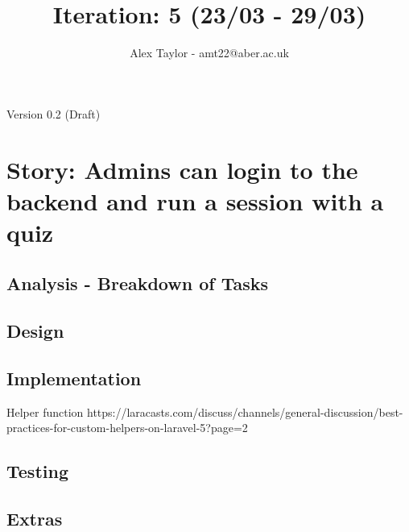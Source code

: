 \documentclass{article}
\title{Iteration: 5 (23/03 - 29/03)}
\author{Alex Taylor - amt22@aber.ac.uk}
\begin{document}
\maketitle
\begin{center}
	Version 0.2 (Draft)
\end{center}
\tableofcontents
\thispagestyle{empty}
\newpage

\section{Story: Admins can login to the backend and run a session with a quiz}
\subsection{Analysis - Breakdown of Tasks}
\subsection{Design}
\subsection{Implementation}
Helper function https://laracasts.com/discuss/channels/general-discussion/best-practices-for-custom-helpers-on-laravel-5?page=2
\subsection{Testing}
\subsection{Extras}
\newpage

%
%
\end{document}
